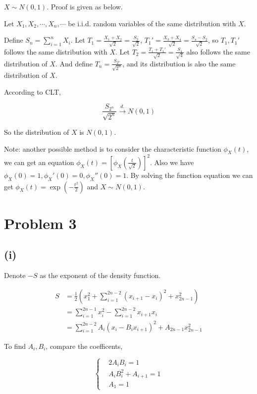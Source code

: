 \documentclass{article}
\begin{document}
$X\sim N(0,1)$. Proof is given as below.

Let $X_1,X_2, \cdots,X_n,\cdots$ be i.i.d. random variables of the same distribution with $X$. 

Define $S_n = \sum_{i=1}^n X_i$. Let $T_{1} = \frac{X_1+X_2}{ \sqrt{2}} = \frac{S_2}{\sqrt{2}}$, $T_1' = \frac{X_3+X_4}{\sqrt{ 2}} = \frac{S_4 -S_2}{ \sqrt{2}}$, so $T_1,T_1'$ follows the same distribution with $X$. Let $T_2 = \frac{T_1+T_1'}{\sqrt{2}} = \frac{S_4}{\sqrt{4}}$ also follows the same distribution of $X$. And define $T_n = \frac{S_{2^n}}{\sqrt{2^n}}$, and its distribution is also the same distribution of $X$. 

According to CLT, 

\begin{equation}
    \frac{S_{2^n}}{\sqrt{2^n}} \overset{d.}{\to} N(0,1)
\end{equation}

So the distribution of $X$ is $N(0,1)$.

Note: another possible method is to consider the characteristic function $\phi_{X}(t)$, we can get an equation $\phi_{X}(t) = [\phi_{X}(\frac{t}{\sqrt{2}})]^2$. Also we have $\phi_{X}(0) =1,\phi_{X}'(0) =0,\phi_{X}''(0) =1 $. By solving the function equation we can get $\phi_X(t) = \exp({-\frac{t^2}{2}})$ and $X \sim N(0,1)$. 

\section{Problem 3}
\subsection{(i)}
Denote $-S$ as the exponent of the density function.

\begin{equation}
    \begin{aligned}
        S & = \frac{1}{2}\left(x_{1}^{2}+\sum_{i=1}^{2 n-2}\left(x_{i+1}-x_{i}\right)^{2}+x_{2 n-1}^{2}\right) \\
        & = \sum_{i=1}^{2n-1} x_i^2 - \sum_{i=1}^{2 n-2} x_{i+1}x_i\\
        & = \sum_{i=1}^{2n-2} A_i( x_i-B_i x_{i+1})^2 + A_{2n-1} x_{2n-1}^2
    \end{aligned}
\end{equation}

To find $A_i,B_i$, compare the coefficents, 

\begin{equation}
    \left\{\begin{aligned}
        & 2 A_i B_i = 1\\
        & A_i B_i^2 + A_{i+1} = 1\\
        & A_1 = 1 
    \end{aligned}\right.
\end{equation}
\end{document}
